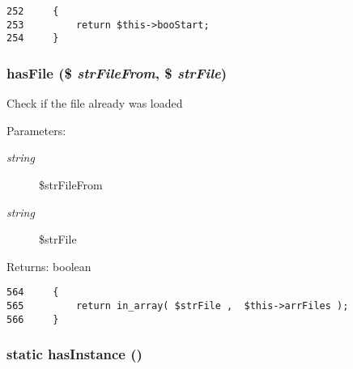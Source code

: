 \begin{Code}\begin{verbatim}252     {
253         return $this->booStart;
254     }
\end{verbatim}
\end{Code}


\hypertarget{class_code_to_diagram_e4efdbde4a95c06ac22d842b8d56a1de}{
\subsubsection[{hasFile}]{\setlength{\rightskip}{0pt plus 5cm}hasFile (\$ {\em strFileFrom}, \/  \$ {\em strFile})}}
\label{class_code_to_diagram_e4efdbde4a95c06ac22d842b8d56a1de}


Check if the file already was loaded

\begin{Desc}
\item[Parameters:]
\begin{description}
\item[{\em string}]\$strFileFrom \item[{\em string}]\$strFile \end{description}
\end{Desc}
\begin{Desc}
\item[Returns:]boolean \end{Desc}


\begin{Code}\begin{verbatim}564     {
565         return in_array( $strFile ,  $this->arrFiles );
566     }
\end{verbatim}
\end{Code}


\hypertarget{class_code_to_diagram_abea252aaf2bf265677fdc29ed4e3fa1}{
\subsubsection[{hasInstance}]{\setlength{\rightskip}{0pt plus 5cm}static hasInstance ()}}
\label{class_code_to_diagram_abea252aaf2bf265677fdc29ed4e3fa1}



